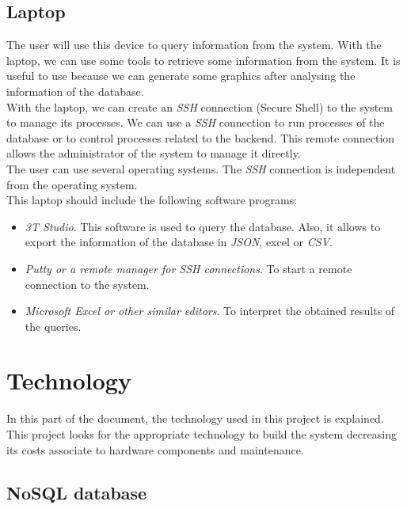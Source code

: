 \subsection{Laptop}

The user will use this device to query information from the system. With the laptop, we can use some tools to retrieve some information from the system. It is useful to use because we can generate some graphics after analysing the information of the database.\\

With the laptop, we can create an \textit{SSH} connection (Secure Shell) to the system to manage its processes. We can use a \textit{SSH} connection to run processes of the database or to control processes related to the backend. This remote connection allows the administrator of the system to manage it directly.\\

The user can use several operating systems. The \textit{SSH} connection is independent from the operating system. \\

This laptop should include the following software programs:

\begin{itemize}

\item \textit{3T Studio}. This software is used to query the database. Also, it allows to export the information of the database in \textit{JSON}, excel or \textit{CSV}.

\item \textit{Putty or a remote manager for SSH connections}. To start a remote connection to the system.

\item \textit{Microsoft Excel or other similar editors}. To interpret the obtained results of the queries.

\end{itemize}

\section{Technology}

In this part of the document, the technology used in this project is explained. This project looks for the appropriate technology to build the system decreasing its costs associate to hardware components and maintenance.

\subsection{NoSQL database}

